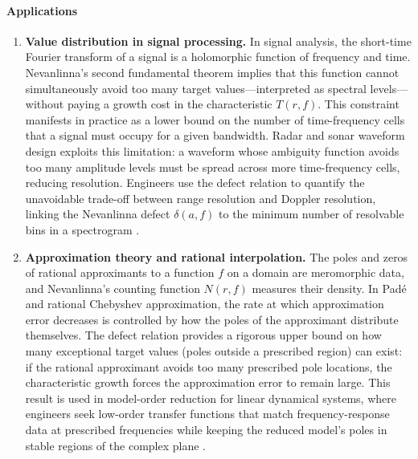 \paragraph{Applications}
\begin{enumerate}[leftmargin=*,itemsep=0.35em]
\item \textbf{Value distribution in signal processing.} In signal analysis, the short-time Fourier transform of a signal is a holomorphic function of frequency and time. Nevanlinna's second fundamental theorem implies that this function cannot simultaneously avoid too many target values---interpreted as spectral levels---without paying a growth cost in the characteristic $T(r,f)$. This constraint manifests in practice as a lower bound on the number of time-frequency cells that a signal must occupy for a given bandwidth. Radar and sonar waveform design exploits this limitation: a waveform whose ambiguity function avoids too many amplitude levels must be spread across more time-frequency cells, reducing resolution. Engineers use the defect relation to quantify the unavoidable trade-off between range resolution and Doppler resolution, linking the Nevanlinna defect $\delta(a,f)$ to the minimum number of resolvable bins in a spectrogram \cite{nevanlinna_theory_ref1,nevanlinna_theory_ref2}.
\item \textbf{Approximation theory and rational interpolation.} The poles and zeros of rational approximants to a function $f$ on a domain are meromorphic data, and Nevanlinna's counting function $N(r,f)$ measures their density. In Pad\'{e} and rational Chebyshev approximation, the rate at which approximation error decreases is controlled by how the poles of the approximant distribute themselves. The defect relation provides a rigorous upper bound on how many exceptional target values (poles outside a prescribed region) can exist: if the rational approximant avoids too many prescribed pole locations, the characteristic growth forces the approximation error to remain large. This result is used in model-order reduction for linear dynamical systems, where engineers seek low-order transfer functions that match frequency-response data at prescribed frequencies while keeping the reduced model's poles in stable regions of the complex plane \cite{nevanlinna_theory_ref2,nevanlinna_theory_ref3}.
\end{enumerate}

